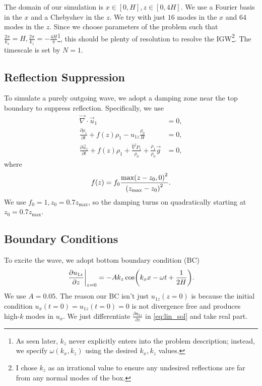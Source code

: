 \documentclass[11pt,
        usenames, %
        dvipsnames %
    ]{article}
\newcommand*{\pd}[2]{\frac{\partial#1}{\partial#2}}
\newcommand*{\at}[1]{\left.#1\right|}
\DeclarePairedDelimiter\p{\lparen}{\rparen}
\begin{document}
The domain of our simulation is $x \in [0, H], z \in [0, 4H]$. We use a Fourier
basis in the $x$ and a Chebyshev in the $z$. We try with just $16$ modes in the
$x$ and $64$ modes in the $z$. Since we choose parameters of the problem such
that $\frac{2\pi}{k_x} = H, \frac{2\pi}{k_z} = -\frac{4H}{\pi}$\footnote{As
seen later, $k_z$ never explicitly enters into the problem description; instead,
we specify $\omega(k_x, k_z)$ using the desired $k_x, k_z$ values.}, this should
be plenty of resolution to resolve the IGW\footnote{I chose $k_z$ as an
irrational value to ensure any undesired reflections are far from any normal
modes of the box.}. The timescale is set by $N = 1$.

\subsection{Reflection Suppression}

To simulate a purely outgoing wave, we adopt a damping zone near the top
boundary to suppress reflection. Specifically, we use
\begin{subequations}\label{eq:lin_feq_sponge}
    \begin{align}
        \vec{\nabla} \cdot \vec{u}_1 &= 0,\\
        \pd{\rho_1}{t} + f(z)\rho_1 - u_{1z}\frac{\rho_0}{H} &= 0,\\
        \pd{\vec{u}_1}{t} + f(z)\rho_1 + \frac{\vec{\nabla}P_1}{\rho_0}
            + \frac{\rho_1}{\rho_0}\vec{g} &= 0,
    \end{align}
\end{subequations}
where
\begin{equation}
    f(z) = f_0 \frac{\max\p*{z - z_0, 0}^2}{\p*{z_{\max} - z_0}^2}.
\end{equation}
We use $f_0 = 1, z_0 = 0.7 z_{\max}$, so the damping turns on quadratically
starting at $z_0 = 0.7z_{\max}$.

\subsection{Boundary Conditions}

To excite the wave, we adopt bottom boundary condition (BC)
\begin{equation}
    \at{\pd{u_{1z}}{z}}_{z = 0} = -Ak_z\cos\p*{k_xx - \omega t + \frac{1}{2H}}.
\end{equation}
We use $A = 0.05$. The reason our BC isn't just $u_{1z}(z = 0)$ is because the
initial condition $u_x(t = 0) = u_{1z}(t = 0) = 0$ is not divergence free and
produces high-$k$ modes in $u_x$. We just differentiate $\pd{u_{1z}}{z}$ in
\autoref{eq:lin_sol} and take real part.
\end{document}
